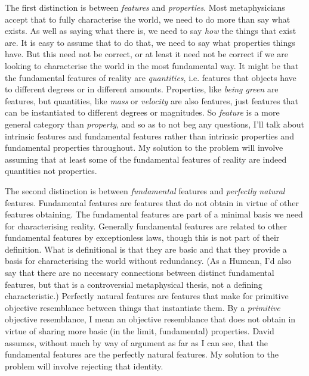 The first distinction is between \textit{features} and \textit{properties}. Most metaphysicians accept that to fully characterise the world, we need to do more than say what exists. As well as saying what there is, we need to say \textit{how} the things that exist are. It is easy to assume that to do that, we need to say what properties things have. But this need not be correct, or at least it need not be correct if we are looking to characterise the world in the most fundamental way. It might be that the fundamental features of reality are \textit{quantities}, i.e. features that objects have to different degrees or in different amounts. Properties, like \textit{being green} are features, but quantities, like \textit{mass} or \textit{velocity} are also features, just features that can be instantiated to different degrees or magnitudes. So \textit{feature} is a more general category than \textit{property}, and so as to not beg any questions, I'll talk about intrinsic features and fundamental features rather than intrinsic properties and fundamental properties throughout. My solution to the problem will involve assuming that at least some of the fundamental features of reality are indeed quantities not properties.

The second distinction is between \textit{fundamental} features and \textit{perfectly natural} features. Fundamental features are features that do not obtain in virtue of other features obtaining. The fundamental features are part of a minimal basis we need for characterising reality. Generally fundamental features are related to other fundamental features by exceptionless laws, though this is not part of their definition. What is definitional is that they are basic and that they provide a basis for characterising the world without redundancy. (As a Humean, I'd also say that there are no necessary connections between distinct fundamental features, but that is a controversial metaphysical thesis, not a defining characteristic.) Perfectly natural features are features that make for primitive objective resemblance between things that instantiate them. By a \textit{primitive} objective resemblance, I mean an objective resemblance that does not obtain in virtue of sharing more basic (in the limit, fundamental) properties. David \citet{Lewis1983e} assumes, without much by way of argument as far as I can see, that the fundamental features are the perfectly natural features. My solution to the problem will involve rejecting that identity.

